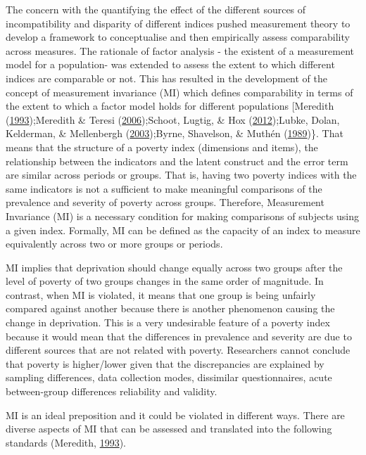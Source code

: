 \documentclass[]{book}
\begin{document}
The concern with the quantifying the effect of the different sources of incompatibility and disparity of different indices pushed measurement theory to develop a framework to conceptualise and then empirically assess comparability across measures. The rationale of factor analysis - the existent of a measurement model for a population- was extended to assess the extent to which different indices are comparable or not. This has resulted in the development of the concept of measurement invariance (MI) which defines comparability in terms of the extent to which a factor model holds for different populations {[}Meredith (\protect\hyperlink{ref-Meredith1993}{1993});Meredith \& Teresi (\protect\hyperlink{ref-Meredith2006}{2006});Schoot, Lugtig, \& Hox (\protect\hyperlink{ref-Schoot2012}{2012});Lubke, Dolan, Kelderman, \& Mellenbergh (\protect\hyperlink{ref-Lubke2003}{2003});Byrne, Shavelson, \& Muthén (\protect\hyperlink{ref-Byrne1989}{1989})\}. That means that the structure of a poverty index (dimensions and items), the relationship between the indicators and the latent construct and the error term are similar across periods or groups. That is, having two poverty indices with the same indicators is not a sufficient to make meaningful comparisons of the prevalence and severity of poverty across groups. Therefore, Measurement Invariance (MI) is a necessary condition for making comparisons of subjects using a given index. Formally, MI can be defined as the capacity of an index to measure equivalently across two or more groups or periods.

MI implies that deprivation should change equally across two groups after the level of poverty of two groups changes in the same order of magnitude. In contrast, when MI is violated, it means that one group is being unfairly compared against another because there is another phenomenon causing the change in deprivation. This is a very undesirable feature of a poverty index because it would mean that the differences in prevalence and severity are due to different sources that are not related with poverty. Researchers cannot conclude that poverty is higher/lower given that the discrepancies are explained by sampling differences, data collection modes, dissimilar questionnaires, acute between-group differences reliability and validity.

MI is an ideal preposition and it could be violated in different ways. There are diverse aspects of MI that can be assessed and translated into the following standards (Meredith, \protect\hyperlink{ref-Meredith1993}{1993}).
\end{document}
